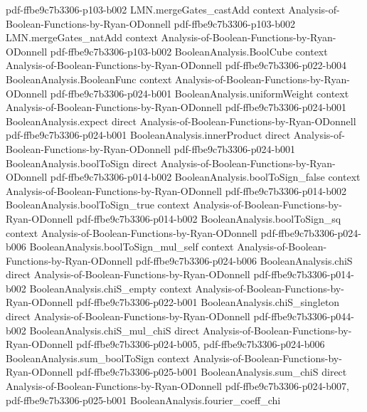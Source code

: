 \begin{lemma}
  {pdf-ffbe9c7b3306-p103-b002}
\proofstep
  {LMN.mergeGates_castAdd}
  {context}
  {Analysis-of-Boolean-Functions-by-Ryan-ODonnell}
  {pdf-ffbe9c7b3306-p103-b002}
\proofstep
  {LMN.mergeGates_natAdd}
  {context}
  {Analysis-of-Boolean-Functions-by-Ryan-ODonnell}
  {pdf-ffbe9c7b3306-p103-b002}
\proofstep
  {BooleanAnalysis.BoolCube}
  {context}
  {Analysis-of-Boolean-Functions-by-Ryan-ODonnell}
  {pdf-ffbe9c7b3306-p022-b004}
\proofstep
  {BooleanAnalysis.BooleanFunc}
  {context}
  {Analysis-of-Boolean-Functions-by-Ryan-ODonnell}
  {pdf-ffbe9c7b3306-p024-b001}
\proofstep
  {BooleanAnalysis.uniformWeight}
  {context}
  {Analysis-of-Boolean-Functions-by-Ryan-ODonnell}
  {pdf-ffbe9c7b3306-p024-b001}
\proofstep
  {BooleanAnalysis.expect}
  {direct}
  {Analysis-of-Boolean-Functions-by-Ryan-ODonnell}
  {pdf-ffbe9c7b3306-p024-b001}
\proofstep
  {BooleanAnalysis.innerProduct}
  {direct}
  {Analysis-of-Boolean-Functions-by-Ryan-ODonnell}
  {pdf-ffbe9c7b3306-p024-b001}
\proofstep
  {BooleanAnalysis.boolToSign}
  {direct}
  {Analysis-of-Boolean-Functions-by-Ryan-ODonnell}
  {pdf-ffbe9c7b3306-p014-b002}
\proofstep
  {BooleanAnalysis.boolToSign_false}
  {context}
  {Analysis-of-Boolean-Functions-by-Ryan-ODonnell}
  {pdf-ffbe9c7b3306-p014-b002}
\proofstep
  {BooleanAnalysis.boolToSign_true}
  {context}
  {Analysis-of-Boolean-Functions-by-Ryan-ODonnell}
  {pdf-ffbe9c7b3306-p014-b002}
\proofstep
  {BooleanAnalysis.boolToSign_sq}
  {context}
  {Analysis-of-Boolean-Functions-by-Ryan-ODonnell}
  {pdf-ffbe9c7b3306-p024-b006}
\proofstep
  {BooleanAnalysis.boolToSign_mul_self}
  {context}
  {Analysis-of-Boolean-Functions-by-Ryan-ODonnell}
  {pdf-ffbe9c7b3306-p024-b006}
\proofstep
  {BooleanAnalysis.chiS}
  {direct}
  {Analysis-of-Boolean-Functions-by-Ryan-ODonnell}
  {pdf-ffbe9c7b3306-p014-b002}
\proofstep
  {BooleanAnalysis.chiS_empty}
  {context}
  {Analysis-of-Boolean-Functions-by-Ryan-ODonnell}
  {pdf-ffbe9c7b3306-p022-b001}
\proofstep
  {BooleanAnalysis.chiS_singleton}
  {direct}
  {Analysis-of-Boolean-Functions-by-Ryan-ODonnell}
  {pdf-ffbe9c7b3306-p044-b002}
\proofstep
  {BooleanAnalysis.chiS_mul_chiS}
  {direct}
  {Analysis-of-Boolean-Functions-by-Ryan-ODonnell}
  {pdf-ffbe9c7b3306-p024-b005,
    pdf-ffbe9c7b3306-p024-b006}
\proofstep
  {BooleanAnalysis.sum_boolToSign}
  {context}
  {Analysis-of-Boolean-Functions-by-Ryan-ODonnell}
  {pdf-ffbe9c7b3306-p025-b001}
\proofstep
  {BooleanAnalysis.sum_chiS}
  {direct}
  {Analysis-of-Boolean-Functions-by-Ryan-ODonnell}
  {pdf-ffbe9c7b3306-p024-b007,
    pdf-ffbe9c7b3306-p025-b001}
\proofstep
  {BooleanAnalysis.fourier_coeff_chi}

\end{lemma}

